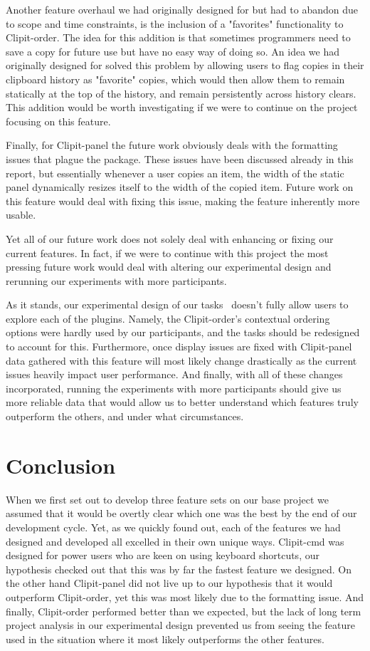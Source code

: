 \documentclass{acm_proc_article-sp}
\begin{document}
Another feature overhaul we had originally designed for but had to abandon due to scope and time constraints, is the inclusion of a "favorites" functionality to Clipit-order. The idea for this addition is that sometimes programmers need to save a copy for future use but have no easy way of doing so. An idea we had originally designed for solved this problem by allowing users to flag copies in their clipboard history as "favorite" copies, which would then allow them to remain statically at the top of the history, and remain persistently across history clears. This addition would be worth investigating if we were to continue on the project focusing on this feature.

Finally, for Clipit-panel the future work obviously deals with the formatting issues that plague the package. These issues have been discussed already in this report, but essentially whenever a user copies an item, the width of the static panel dynamically resizes itself to the width of the copied item. Future work on this feature would deal with fixing this issue, making the feature inherently more usable.

Yet all of our future work does not solely deal with enhancing or fixing our current features. In fact, if we were to continue with this project the most pressing future work would deal with altering our experimental design and rerunning our experiments with more participants. 

As it stands, our experimental design of our tasks~\cite{Tasks} doesn't fully allow users to explore each of the plugins. Namely, the Clipit-order's contextual ordering options were hardly used by our participants, and the tasks should be redesigned to account for this. Furthermore, once display issues are fixed with Clipit-panel data gathered with this feature will most likely change drastically as the current issues heavily impact user performance. And finally, with all of these changes incorporated, running the experiments with more participants should give us more reliable data that would allow us to better understand which features truly outperform the others, and under what circumstances.

\section{Conclusion}\label{sec:conclusion}

When we first set out to develop three feature sets on our base project we assumed that it would be overtly clear which one was the best by the end of our development cycle. Yet, as we quickly found out, each of the features we had designed and developed all excelled in their own unique ways. Clipit-cmd was designed for power users who are keen on using keyboard shortcuts, our hypothesis checked out that this was by far the fastest feature we designed. On the other hand Clipit-panel did not live up to our hypothesis that it would outperform Clipit-order, yet this was most likely due to the formatting issue. And finally, Clipit-order performed better than we expected, but the lack of long term project analysis in our experimental design prevented us from seeing the feature used in the situation where it most likely outperforms the other features.
\end{document}
